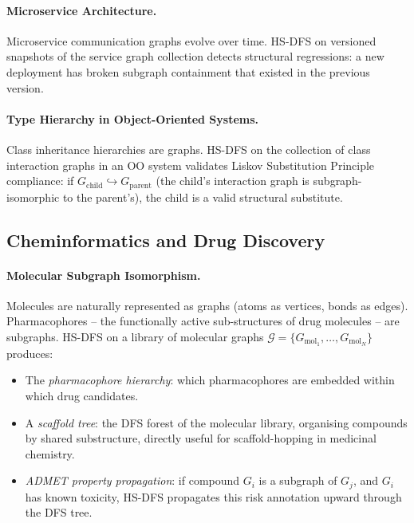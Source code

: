 ﻿\documentclass[12pt,a4paper]{article}
\theoremstyle{plain}
\theoremstyle{definition}
\theoremstyle{remark}
\begin{document}
	\paragraph{Microservice Architecture.}
	Microservice communication graphs evolve over time.  HS-DFS on versioned
	snapshots of the service graph collection detects structural regressions:
	a new deployment has broken subgraph containment that existed in the previous
	version.
	
	\paragraph{Type Hierarchy in Object-Oriented Systems.}
	Class inheritance hierarchies are graphs.  HS-DFS on the collection of class
	interaction graphs in an OO system validates Liskov Substitution Principle
	compliance: if $G_{\text{child}} \hookrightarrow G_{\text{parent}}$
	(the child's interaction graph is subgraph-isomorphic to the parent's),
	the child is a valid structural substitute.
	
	\subsection{Cheminformatics and Drug Discovery}
	\label{sec:chemo}
	
	\paragraph{Molecular Subgraph Isomorphism.}
	Molecules are naturally represented as graphs (atoms as vertices, bonds as
	edges).  Pharmacophores -- the functionally active sub-structures of drug
	molecules -- are subgraphs.  HS-DFS on a library of molecular graphs
	$\mathcal{G} = \{G_{\text{mol}_1}, \ldots, G_{\text{mol}_N}\}$ produces:
	\begin{itemize}
		\item The \emph{pharmacophore hierarchy}: which pharmacophores are embedded
		within which drug candidates.
		\item A \emph{scaffold tree}: the DFS forest of the molecular library,
		organising compounds by shared substructure, directly useful for
		scaffold-hopping in medicinal chemistry.
		\item \emph{ADMET property propagation}: if compound $G_i$ is a subgraph
		of $G_j$, and $G_i$ has known toxicity, HS-DFS propagates this
		risk annotation upward through the DFS tree.
	\end{itemize}
	
\end{document}
